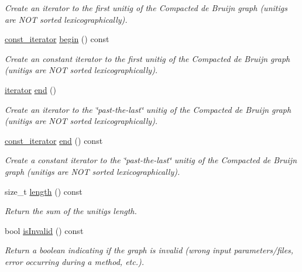 \begin{DoxyCompactItemize}
\begin{DoxyCompactList}\small\item\em Create an iterator to the first unitig of the Compacted de Bruijn graph (unitigs are N\+OT sorted lexicographically). \end{DoxyCompactList}\item 
\hyperlink{classCompactedDBG_a7725fc78ad52227df1f70d9b8f44622c}{const\+\_\+iterator} \hyperlink{classCompactedDBG_ab2768195113d859b806e77b56c9b3c2f}{begin} () const
\begin{DoxyCompactList}\small\item\em Create an constant iterator to the first unitig of the Compacted de Bruijn graph (unitigs are N\+OT sorted lexicographically). \end{DoxyCompactList}\item 
\hyperlink{classCompactedDBG_af4a6df70628f698d9a2ee843b5359883}{iterator} \hyperlink{classCompactedDBG_ad8629de8e7d29ba9bca59c1179b1f88f}{end} ()
\begin{DoxyCompactList}\small\item\em Create an iterator to the \char`\"{}past-\/the-\/last\char`\"{} unitig of the Compacted de Bruijn graph (unitigs are N\+OT sorted lexicographically). \end{DoxyCompactList}\item 
\hyperlink{classCompactedDBG_a7725fc78ad52227df1f70d9b8f44622c}{const\+\_\+iterator} \hyperlink{classCompactedDBG_a9145ad4ca08f9be984cb85a1ab6477f3}{end} () const
\begin{DoxyCompactList}\small\item\em Create a constant iterator to the \char`\"{}past-\/the-\/last\char`\"{} unitig of the Compacted de Bruijn graph (unitigs are N\+OT sorted lexicographically). \end{DoxyCompactList}\item 
size\+\_\+t \hyperlink{classCompactedDBG_a9f10000ce74e3b3cc6e9cc394cbaba3c}{length} () const
\begin{DoxyCompactList}\small\item\em Return the sum of the unitigs length. \end{DoxyCompactList}\item 
bool \hyperlink{classCompactedDBG_a5c2e72fe85306aa4ac190ae9b3e9b3a7}{is\+Invalid} () const
\begin{DoxyCompactList}\small\item\em Return a boolean indicating if the graph is invalid (wrong input parameters/files, error occurring during a method, etc.). \end{DoxyCompactList}\item 

\end{DoxyCompactItemize}
